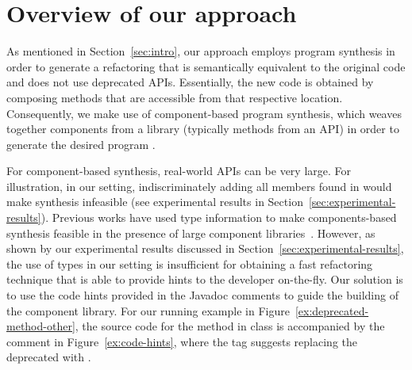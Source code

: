 \documentclass[sigconf,review,anonymous]{acmart}
\begin{document}
\section{Overview of our approach} \label{sec:overview}

As mentioned in Section~\ref{sec:intro}, our approach employs program synthesis
in order to generate a refactoring that is semantically equivalent to the original code and
does not use deprecated APIs.
Essentially, the new code is obtained by composing methods
that are accessible from that respective location. 
Consequently, we make use of component-based program synthesis,
which weaves together components from a library
(typically methods from an API) in order to generate the desired program \cite{DBLP:conf/icse/JhaGST10,DBLP:conf/pldi/GulwaniJTV11,DBLP:conf/popl/FengM0DR17}.

For component-based synthesis, real-world
APIs can be very large. %
For illustration, in our setting, indiscriminately adding all members
found in  would make synthesis infeasible (see experimental results in Section~\ref{sec:experimental-results}).
%
Previous works have used type information to make components-based synthesis
feasible in the presence of large component
libraries~\cite{DBLP:conf/popl/FengM0DR17}.  However, as shown by our
experimental results discussed in
Section~\ref{sec:experimental-results}, the use of types in our setting is insufficient
for obtaining a fast refactoring technique that is able to
provide hints to the developer on-the-fly.
%
%
Our solution is to use the code hints provided in the Javadoc comments to guide the building of the component library. For our running example in Figure~\ref{ex:deprecated-method-other}, the source code for the  method in class  is accompanied by the comment in Figure~\ref{ex:code-hints}, where the  tag suggests replacing the deprecated 
with .
\end{document}
